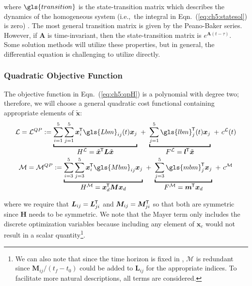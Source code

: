 \noindent where $\gls{transition}$ is the state-transition matrix which describes the dynamics of the homogeneous system (i.e.,~the integral in Eqn.~(\ref{eq:ch5:statesol}) is zero) \cite{Chen1999a}.
The most general transition matrix is given by the Peano-Baker series.
However, if $\bm{A}$ is time-invariant, then the state-transition matrix is $e^{\bm{A}(t-\tau)}$.
Some solution methods will utilize these properties, but in general, the differential equation is challenging to utilize directly.

\subsubsection{Quadratic Objective Function}

The \qp{} objective function in Eqn.~(\ref{eq:ch5:qpH}) is a polynomial with degree two; therefore, we will choose a general quadratic cost functional containing appropriate elements of $\tilde{\bm{x}}$:%
\allowdisplaybreaks[1]%
\begin{gather} \label{eq:ch5:QOFLagrange}
\mathcal{L} = \mathcal{L}^{QP} := 
\underbracket{\sum_{i=1}^5 \sum_{j=1}^5 \bm{x}_i\tran  \gls{Lbm}_{ij}(t) \bm{x}_j}_{\textstyle H^{\mathcal{L}} = \tilde{\bm{x}}\tran  \bL \tilde{\bm{x}} }
\ + \
\underbracket{\sum_{j=1}^5 \gls{lbm}_j\tran (t) \bm{x}_j}_{\textstyle F^{\mathcal{L}} = \bl\tran   \tilde{\bm{x}}}
\ + \
c^{\mathcal{L}}(t) \\ \label{eq:ch5:QOFMayer}
\mathcal{M} = \mathcal{M}^{QP} := 
\underbracket{\sum_{i=3}^5 \sum_{j=3}^5 \bm{x}_i\tran \gls{Mbm}_{ij} \bm{x}_j}_{\textstyle H^{\mathcal{M}} = {\bm{x}}\tran_d \bM {\bm{x}}_d }
\ + \
\underbracket{\sum_{j=3}^5 \gls{mbm}\tran_j \bm{x}_j}_{\textstyle F^{\mathcal{M}} = \bmm\tran  \bm{x}_d}
\ + \
c^{\mathcal{M}}
\end{gather}
\allowdisplaybreaks[0]%

\noindent where we require that $\bm{L}_{ij} = \bm{L}_{ji}^{\mkern-1.5mu\mathsf{T}}$ and $\bm{M}_{ij} = \bm{M}_{ji}^{\mkern-1.5mu\mathsf{T}}$ so that both are symmetric since $\mathbf{H}$ needs to be symmetric.
We note that the Mayer term only includes the discrete optimization variables because including any element of $\bm{x}_c$ would not result in a scalar quantity\footnote{We can also note that since the time horizon is fixed in \lqdo, $\mathcal{M}$ is redundant since $\bm{M}_{ij}/(t_f-t_0)$ could be added to $\bm{L}_{ij}$ for the appropriate indices.
To facilitate more natural descriptions, all terms are considered.}.

